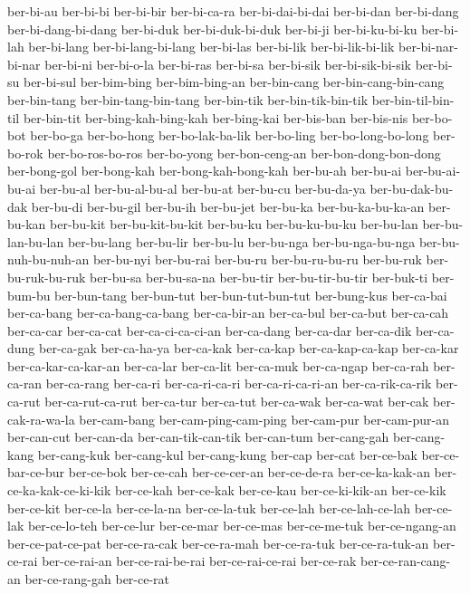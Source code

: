 {ber-bi-au ber-bi-bi ber-bi-bir ber-bi-ca-ra ber-bi-dai-bi-dai ber-bi-dan
ber-bi-dang ber-bi-dang-bi-dang ber-bi-duk ber-bi-duk-bi-duk ber-bi-ji
ber-bi-ku-bi-ku ber-bi-lah ber-bi-lang ber-bi-lang-bi-lang ber-bi-las
ber-bi-lik ber-bi-lik-bi-lik ber-bi-nar-bi-nar ber-bi-ni ber-bi-o-la
ber-bi-ras ber-bi-sa ber-bi-sik ber-bi-sik-bi-sik ber-bi-su ber-bi-sul
ber-bim-bing ber-bim-bing-an ber-bin-cang ber-bin-cang-bin-cang
ber-bin-tang ber-bin-tang-bin-tang ber-bin-tik ber-bin-tik-bin-tik
ber-bin-til-bin-til ber-bin-tit ber-bing-kah-bing-kah ber-bing-kai
ber-bis-ban ber-bis-nis ber-bo-bot ber-bo-ga ber-bo-hong ber-bo-lak-ba-lik
ber-bo-ling ber-bo-long-bo-long ber-bo-rok ber-bo-ros-bo-ros ber-bo-yong
ber-bon-ceng-an ber-bon-dong-bon-dong ber-bong-gol ber-bong-kah
ber-bong-kah-bong-kah ber-bu-ah ber-bu-ai ber-bu-ai-bu-ai ber-bu-al
ber-bu-al-bu-al ber-bu-at ber-bu-cu ber-bu-da-ya ber-bu-dak-bu-dak
ber-bu-di ber-bu-gil ber-bu-ih ber-bu-jet ber-bu-ka ber-bu-ka-bu-ka-an
ber-bu-kan ber-bu-kit ber-bu-kit-bu-kit ber-bu-ku ber-bu-ku-bu-ku
ber-bu-lan ber-bu-lan-bu-lan ber-bu-lang ber-bu-lir ber-bu-lu ber-bu-nga
ber-bu-nga-bu-nga ber-bu-nuh-bu-nuh-an ber-bu-nyi ber-bu-rai ber-bu-ru
ber-bu-ru-bu-ru ber-bu-ruk ber-bu-ruk-bu-ruk ber-bu-sa ber-bu-sa-na
ber-bu-tir ber-bu-tir-bu-tir ber-buk-ti ber-bum-bu ber-bun-tang
ber-bun-tut ber-bun-tut-bun-tut ber-bung-kus ber-ca-bai ber-ca-bang
ber-ca-bang-ca-bang ber-ca-bir-an ber-ca-bul ber-ca-but ber-ca-cah
ber-ca-car ber-ca-cat ber-ca-ci-ca-ci-an ber-ca-dang ber-ca-dar ber-ca-dik
ber-ca-dung ber-ca-gak ber-ca-ha-ya ber-ca-kak ber-ca-kap
ber-ca-kap-ca-kap ber-ca-kar ber-ca-kar-ca-kar-an ber-ca-lar ber-ca-lit
ber-ca-muk ber-ca-ngap ber-ca-rah ber-ca-ran ber-ca-rang ber-ca-ri
ber-ca-ri-ca-ri ber-ca-ri-ca-ri-an ber-ca-rik-ca-rik ber-ca-rut
ber-ca-rut-ca-rut ber-ca-tur ber-ca-tut ber-ca-wak ber-ca-wat ber-cak
ber-cak-ra-wa-la ber-cam-bang ber-cam-ping-cam-ping ber-cam-pur
ber-cam-pur-an ber-can-cut ber-can-da ber-can-tik-can-tik ber-can-tum
ber-cang-gah ber-cang-kang ber-cang-kuk ber-cang-kul ber-cang-kung ber-cap
ber-cat ber-ce-bak ber-ce-bar-ce-bur ber-ce-bok ber-ce-cah ber-ce-cer-an
ber-ce-de-ra ber-ce-ka-kak-an ber-ce-ka-kak-ce-ki-kik ber-ce-kah
ber-ce-kak ber-ce-kau ber-ce-ki-kik-an ber-ce-kik ber-ce-kit ber-ce-la
ber-ce-la-na ber-ce-la-tuk ber-ce-lah ber-ce-lah-ce-lah ber-ce-lak
ber-ce-lo-teh ber-ce-lur ber-ce-mar ber-ce-mas ber-ce-me-tuk
ber-ce-ngang-an ber-ce-pat-ce-pat ber-ce-ra-cak ber-ce-ra-mah
ber-ce-ra-tuk ber-ce-ra-tuk-an ber-ce-rai ber-ce-rai-an ber-ce-rai-be-rai
ber-ce-rai-ce-rai ber-ce-rak ber-ce-ran-cang-an ber-ce-rang-gah ber-ce-rat
}
